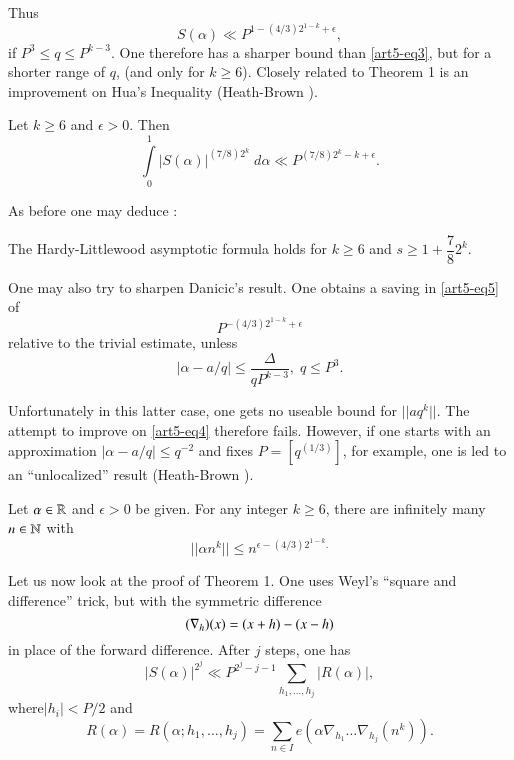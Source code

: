 Thus\pageoriginale 
$$
S(\alpha) \ll P^{1-(4/3)2^{1-k} + \epsilon},
$$
if $P^3 \leqslant q \leqslant P^{k-3}$. One therefore has a sharper bound than \eqref{art5-eq3}, but for a shorter range of $q$, (and only for $k \geqslant 6$). Closely related to Theorem 1 is an improvement on Hua's Inequality (Heath-Brown \cite{art5-key3}).

\begin{theorem}\label{art5-thm2}
Let $k \geqslant 6$ and $\epsilon > 0$. Then 
$$
\int\limits^1_0 |S(\alpha)|^{(7/8)2^k} \; d \alpha \ll P^{(7/8)2^k -k+\epsilon}.
$$
\end{theorem}

As before one may deduce :

\begin{coro*}
The Hardy-Littlewood asymptotic formula \cite{art5-key1} holds for $k \geqslant 6$ and $s \geqslant 1 + \dfrac{7}{8} 2^k$.
\end{coro*}

One may also try to sharpen Danicic's result.  One obtains a saving in \eqref{art5-eq5} of
$$
P^{-(4/3)2^{1-k} + \epsilon}
$$
relative to the trivial estimate, unless
$$
|\alpha -a/q| \leqslant \frac{\Delta}{qP^{k-3}}, \; q  \leqslant P^3.
$$

Unfortunately in this latter case, one gets no useable bound for $||aq^k||$. The attempt to improve on \eqref{art5-eq4} therefore fails. However, if one starts with an approximation $|\alpha -a/q| \leqslant q^{-2}$ and fixes $P =[q^{(1/3)}]$, for example, one is led to an ``unlocalized''  result (Heath-Brown \cite{art5-key3}).

\begin{theorem}\label{art5-thm3}
Let $\alpha \in \mathbb{R}$ and $\epsilon > 0$ be given. For any integer $k \geqslant 6$, there are infinitely many $n \in \mathbb{N}$ with 
$$
||\alpha n^k || \leqslant n^{\epsilon - (4/3)2^{1-k}.}
$$
\end{theorem}

Let us now look at the proof of Theorem 1. One uses Weyl's ``square and difference'' trick, but with the symmetric difference 
$$
(\nabla_h \empty) (x) =\empty (x+h) - \empty (x-h)
$$
in place of the forward difference. After $j$ steps,  one has
\begin{equation}
|S(\alpha)|^{2^j} \ll P^{2^j - j -1} \sum\limits_{h_1, \ldots, h_j} |R(\alpha)|,
\label{art5-eq7}
\end{equation}
where\pageoriginale $|h_i| < P/2$ and
$$
R(\alpha) = R (\alpha; h_1, \ldots, h_j) = \sum\limits_{n\in I} e (\alpha \nabla_{h_1} \ldots \nabla_{h_j} (n^k)).
$$

